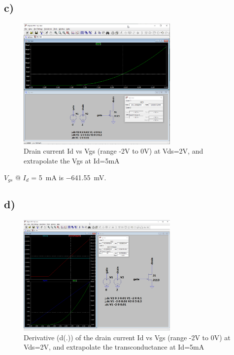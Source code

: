 \documentclass{article}
\begin{document}
	\subsection*{c)}
	
	\begin{figure}[H]
	    \centering
	    \includegraphics[width=0.7\textwidth]{1c}
	    \caption{Drain current Id vs Vgs (range -2V to 0V) at Vds=2V, and extrapolate the Vgs at Id=5mA}
	\end{figure}
	
	$V_{gs}$ @ $I_d$ = \SI{5}{\mA} is \SI{-641.55}{\mV}.
	
	\subsection*{d)}
	
	\begin{figure}[H]
	    \centering
	    \includegraphics[width=0.7\textwidth]{1d}
	    \caption{Derivative (d(.)) of the drain current Id vs Vgs (range -2V to 0V) at Vds=2V, and extrapolate the
transconductance at Id=5mA}
	\end{figure}
\end{document}
